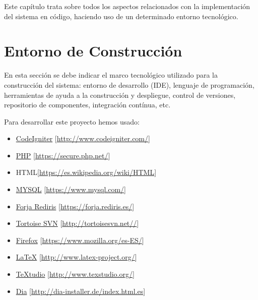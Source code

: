

Este capítulo trata sobre todos los aspectos relacionados con la implementación del sistema en código, haciendo uso de un determinado entorno tecnológico.

\section{Entorno de Construcción}
En esta sección se debe indicar el marco tecnológico utilizado para la construcción del sistema: entorno de desarrollo (IDE), lenguaje de programación, herramientas de ayuda a la construcción y despliegue, control de versiones, repositorio de componentes, integración contínua, etc.

Para desarrollar este proyecto hemos usado:

\begin{itemize}
	\item \href{http://www.codeigniter.com/}{CodeIgniter} [\url{http://www.codeigniter.com/}]
	\item \href{https://secure.php.net/}{PHP} [\url{https://secure.php.net/}]
	\item HTML[\url{https://es.wikipedia.org/wiki/HTML}]
	\item \href{https://www.mysql.com/}{MYSQL} [\url{https://www.mysql.com/}]
	\item \href{https://forja.rediris.es/}{Forja Rediris} [\url{https://forja.rediris.es/}]
	\item \href{http://tortoisesvn.net/}{Tortoise SVN} [\url{http://tortoisesvn.net//}]
	\item \href{https://www.mozilla.org/es-ES/}{Firefox} [\url{https://www.mozilla.org/es-ES/}]
	\item \href{http://www.latex-project.org/}{LaTeX} [\url{http://www.latex-project.org/}]
	\item \href{http://www.texstudio.org/}{TeXtudio} [\url{http://www.texstudio.org/}]
	\item \href{http://dia-installer.de/index.html.es}{Dia} [\url{http://dia-installer.de/index.html.es}]	
\end{itemize}

